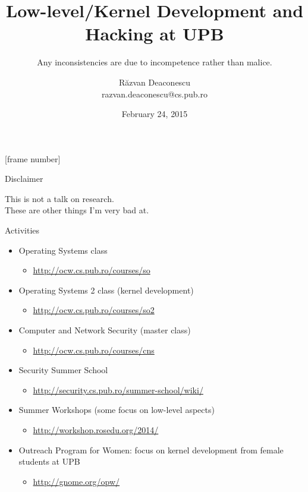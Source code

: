 \documentclass{beamer}
\title[Low-level/Hacking @UPB]{Low-level/Kernel Development and Hacking at
UPB}
\subtitle{Any inconsistencies are due to incompetence rather than malice.}
\institute{EPFL Visit, Les Diablerets}
\author[Răzvan Deaconescu]{Răzvan Deaconescu\\
  razvan.deaconescu@cs.pub.ro}
\date{February 24, 2015}
\begin{document}
[frame number]

\begin{frame}{Disclaimer}
  \begin{center}
    \Large
    This is not a talk on research. \\
    These are other things I'm very bad at.
  \end{center}
\end{frame}

\frame{\titlepage}

\begin{frame}{Activities}
  \begin{itemize}
    \pause \item Operating Systems class
      \begin{itemize}
        \item \url{http://ocw.cs.pub.ro/courses/so}
      \end{itemize}
    \pause \item Operating Systems 2 class (kernel development)
      \begin{itemize}
        \item \url{http://ocw.cs.pub.ro/courses/so2}
      \end{itemize}
    \pause \item Computer and Network Security (master class)
      \begin{itemize}
        \item \url{http://ocw.cs.pub.ro/courses/cns}
      \end{itemize}
    \pause \item Security Summer School
      \begin{itemize}
        \item \url{http://security.cs.pub.ro/summer-school/wiki/}
      \end{itemize}
    \pause \item Summer Workshops (some focus on low-level aspects)
      \begin{itemize}
        \item \url{http://workshop.rosedu.org/2014/}
      \end{itemize}
    \pause \item Outreach Program for Women: focus on kernel development from
      female students at UPB
      \begin{itemize}
        \item \url{http://gnome.org/opw/}
      \end{itemize}
  \end{itemize}
\end{frame}
\end{document}
